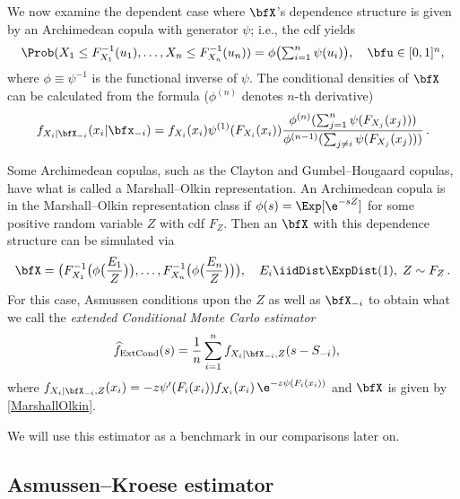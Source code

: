 We now examine the dependent case where $\bfX$'s dependence structure is given by an Archimedean copula with generator $\psi$; i.e., the cdf yields
\begin{equation*}
\textstyle
\Prob(X_1\le F_{X_1}^{-1}(u_1), \dots, X_n \le F_{X_n}^{-1}(u_n)) =\phi\bigl( \sum_{i=1}^n \psi(u_i) \bigr),\quad \bfu\in[0,1]^n,
\end{equation*}
where $\phi\equiv \psi^{-1}$ is the functional inverse of $\psi$.
 The  conditional densities of $\bfX$ can be calculated from the formula
($\phi^{(n)}$ denotes $n$-th derivative)
\begin{equation} \label{GenCondMC}
f_{X_i | \bfX_{-i}}(x_i | \bfx_{-i}) = f_{X_i}(x_i) \psi^{(1)}( F_{X_i}(x_i)) \frac{\phi^{(n)}( \sum_{j=1}^n \psi(F_{X_j}(x_j)) ) }{\phi^{(n-1)}( \sum_{j\not=i} \psi(F_{X_j}(x_j)))} \,.
\end{equation}

Some Archimedean copulas, such as the Clayton and Gumbel--Hougaard copulas, have what is called a Marshall--Olkin representation. An Archimedean copula is in the Marshall--Olkin representation class if  $\phi(s) = \Exp[\e^{-s Z}]$ for some positive random variable $Z$ with cdf $F_Z$. Then an $\bfX$ with this dependence structure can be simulated via
\begin{equation} \label{MarshallOlkin} \bfX = \bigl(F_{X_1}^{-1}\bigl( \phi\bigl(\frac{E_1}{Z}\bigr) \bigr), \dots, F_{X_n}^{-1}\bigl( \phi\bigl(\frac{E_n}{Z}\bigr) \bigr) \bigr) , \quad E_i \iidDist \ExpDist(1),\; Z \sim F_Z \,.
\end{equation}
For this case, Asmussen \cite[Proposition~8.3]{asmussen2017conditional} conditions upon the $Z$ as well as $\bfX_{-i}$ to obtain what we call the \emph{extended Conditional Monte Carlo estimator}
\begin{align} \label{ExtCondMC}
 \widehat{f}_{\mathrm{ExtCond}}(s) &= \frac{1}{n}\sum_{i=1}^n f_{X_i | \bfX_{-i}, Z}( s - S_{-i} ),
\end{align}
where $f_{X_i | \bfX_{-i}, Z}(x_i ) = -z \psi'(F_i( x_i )) f_{X_i}( x_i ) \, \e^{ -z \psi(F_i( x_i )) }$ and  $\bfX$ is given by \eqref{MarshallOlkin}.


We will use this estimator as a benchmark in our comparisons later on.

\subsection{Asmussen--Kroese estimator} \label{ssec:AK}

